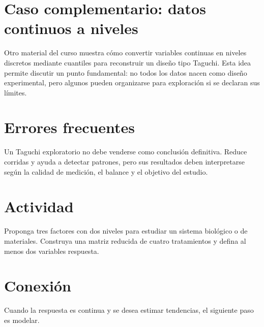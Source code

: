 \section{Caso complementario: datos continuos a niveles}

Otro material del curso muestra cómo convertir variables continuas en niveles discretos mediante cuantiles para reconstruir un diseño tipo Taguchi. Esta idea permite discutir un punto fundamental: no todos los datos nacen como diseño experimental, pero algunos pueden organizarse para exploración si se declaran sus límites.

\section{Errores frecuentes}

\begin{cuidado}
Un Taguchi exploratorio no debe venderse como conclusión definitiva. Reduce corridas y ayuda a detectar patrones, pero sus resultados deben interpretarse según la calidad de medición, el balance y el objetivo del estudio.
\end{cuidado}

\section{Actividad}

Proponga tres factores con dos niveles para estudiar un sistema biológico o de materiales. Construya una matriz reducida de cuatro tratamientos y defina al menos dos variables respuesta.

\section{Conexión}

Cuando la respuesta es continua y se desea estimar tendencias, el siguiente paso es modelar.
